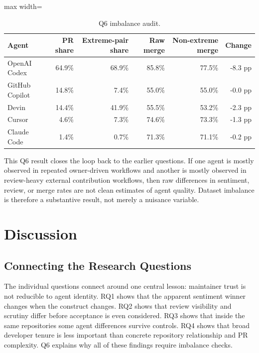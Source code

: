 \documentclass[sigconf,nonacm]{acmart}
\begin{document}
\begin{table}[!htbp]
\caption{Q6 imbalance audit.}
\label{tab:q6}
\centering
\scriptsize
\begin{adjustbox}{max width=\linewidth}
\begin{tabular}{lrrrrr}
\toprule
Agent & PR share & Extreme-pair share & Raw merge & Non-extreme merge & Change \\
\midrule
OpenAI Codex & 64.9\% & 68.9\% & 85.8\% & 77.5\% & -8.3 pp \\
GitHub Copilot & 14.8\% & 7.4\% & 55.0\% & 55.0\% & -0.0 pp \\
Devin & 14.4\% & 41.9\% & 55.5\% & 53.2\% & -2.3 pp \\
Cursor & 4.6\% & 7.3\% & 74.6\% & 73.3\% & -1.3 pp \\
Claude Code & 1.4\% & 0.7\% & 71.3\% & 71.1\% & -0.2 pp \\
\bottomrule
\end{tabular}
\end{adjustbox}
\end{table}

This Q6 result closes the loop back to the earlier questions. If one agent is mostly observed in repeated owner-driven workflows and another is mostly observed in review-heavy external contribution workflows, then raw differences in sentiment, review, or merge rates are not clean estimates of agent quality. Dataset imbalance is therefore a substantive result, not merely a nuisance variable.

\FloatBarrier
\section{Discussion}

\subsection{Connecting the Research Questions}

The individual questions connect around one central lesson: maintainer trust is not reducible to agent identity. RQ1 shows that the apparent sentiment winner changes when the construct changes. RQ2 shows that review visibility and scrutiny differ before acceptance is even considered. RQ3 shows that inside the same repositories some agent differences survive controls. RQ4 shows that broad developer tenure is less important than concrete repository relationship and PR complexity. Q6 explains why all of these findings require imbalance checks.
\end{document}
